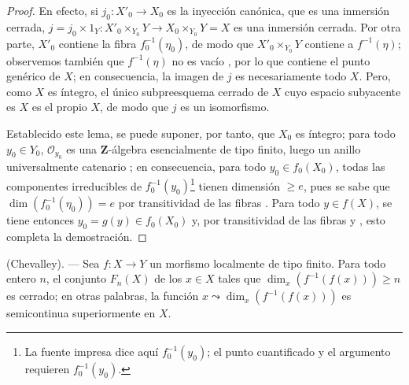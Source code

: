 \begin{proof}
En efecto, si $j_0:X'_0\to X_0$ es la inyección canónica, que es una inmersión cerrada, $j=j_0\times 1_Y:X'_0\times_{Y_0}Y\to X_0\times_{Y_0}Y=X$ es una inmersión cerrada.
Por otra parte, $X'_0$ contiene la fibra $f_0^{-1}(\eta_0)$, de modo que $X'_0\times_{Y_0}Y$ contiene a $f^{-1}(\eta)$; observemos también que $f^{-1}(\eta)$ no es vacío , por lo que contiene el punto genérico de $X$; en consecuencia, la imagen de $j$ es necesariamente todo $X$.
Pero, como $X$ es íntegro, el único subpreesquema cerrado de $X$ cuyo espacio subyacente es $X$ es el propio $X$, de modo que $j$ es un isomorfismo.

Establecido este lema, se puede suponer, por tanto, que $X_0$ es íntegro; para todo $y_0\in Y_0$, $\mathcal O_{y_0}$ es una $\mathbf Z$-álgebra esencialmente de tipo finito, luego un anillo universalmente
catenario ; en consecuencia, para todo $y_0\in f_0(X_0)$, todas las componentes irreducibles de $f_0^{-1}(y_0)$\footnote{La fuente impresa dice aquí $f_0^{-1}(y_0)$; el punto cuantificado y el argumento requieren $f_0^{-1}(y_0)$.} tienen dimensión $\geq e$, pues se sabe que $\dim(f_0^{-1}(\eta_0))=e$ por transitividad de las fibras .
Para todo $y\in f(X)$, se tiene entonces $y_0=g(y)\in f_0(X_0)$ y, por transitividad de las fibras y , esto completa la demostración.
\end{proof}

\begin{theorem}[13.1.3]
\label{IV.13.1.3}
\textnormal{(Chevalley).} ---
Sea $f:X\to Y$ un morfismo localmente de tipo finito.
Para todo entero $n$, el conjunto $F_n(X)$ de los $x\in X$ tales que $\dim_x(f^{-1}(f(x)))\geq n$ es cerrado; en otras palabras, la función $x\leadsto\dim_x(f^{-1}(f(x)))$ es semicontinua superiormente en $X$.
\end{theorem}

